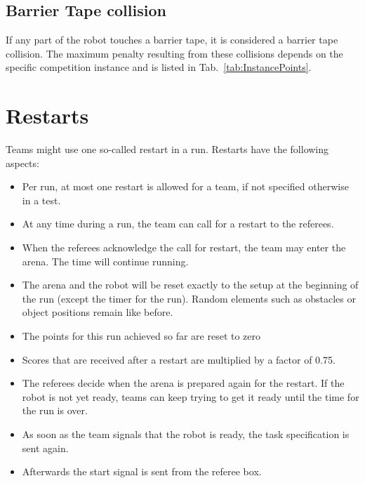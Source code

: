\subsection{Barrier Tape collision}
If any part of the robot touches a barrier tape, it is considered a barrier tape collision. The maximum penalty resulting from these collisions depends on the specific competition instance and is listed in Tab.~\ref{tab:InstancePoints}.






\section{Restarts}
Teams might use one so-called restart in a run. Restarts have the following aspects:

\begin{itemize}

	\item Per run, at most one restart is allowed for a team, if not specified otherwise in a test.
	\item At any time during a run, the team can call for a restart to the referees.
	\item When the referees acknowledge the call for restart, the team may enter the arena. The time will continue running.
	\item The arena and the robot will be reset exactly to the setup at the beginning of the run (except the timer for the run). Random elements such as obstacles or object positions remain like before.
	\item The points for this run achieved so far are reset to zero
	\item Scores that are received after a restart are multiplied by a factor of 0.75.
	\item The referees decide when the arena is prepared again for the restart. If 	the robot is not yet ready, teams can keep trying to get it ready until the time for the run is over.
	\item As soon as the team signals that the robot is ready, the task specification is sent again.
	\item Afterwards the start signal is sent from the referee box.

\end{itemize}



